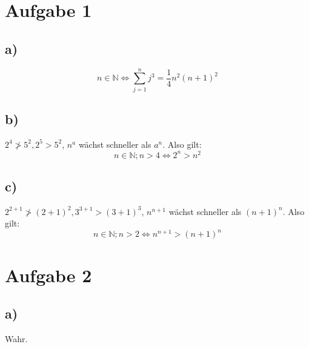 \documentclass[12pt,a4paper,notitlepage]{article}
\title{}
\newcommand{\aufgabe}[1]{\section*{\setcounter{section}{#1}Aufgabe #1}}
\begin{document}
\aufgabe{1}
\subsection*{a)}
\begin{equation}
n\in\mathbb{N}\Leftrightarrow \sum^n_{j=1}j^3=\frac{1}{4}n^2(n+1)^2
\end{equation}
\subsection*{b)}$2^4\ngtr5^2, 2^5>5^2$, $n^a$ wächst schneller als $a^n$. Also gilt:
\begin{equation}
n\in\mathbb{N}; n>4\Leftrightarrow 2^n>n^2
\end{equation}
\subsection*{c)}$2^{2+1}\ngtr(2+1)^2, 3^{3+1}>(3+1)^3$, $n^{n+1}$ wächst schneller als $(n+1)^n$. Also gilt:
\begin{equation}
n\in\mathbb{N}; n>2\Leftrightarrow n^{n+1}>(n+1)^n
\end{equation}
\aufgabe{2}
\subsection*{a)}
Wahr.
\end{document}
